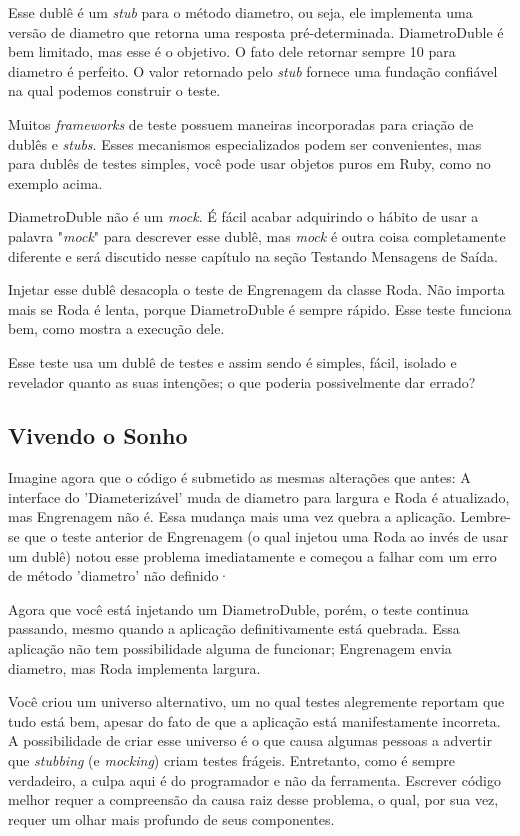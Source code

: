 Esse dublê é um \textit{stub} para o método diametro, ou seja, ele implementa
uma versão de diametro que retorna uma resposta pré-determinada. DiametroDuble
é bem limitado, mas esse é o objetivo. O fato dele retornar sempre 10 para
diametro é perfeito. O valor retornado pelo \textit{stub} fornece uma fundação
confiável na qual podemos construir o teste.

Muitos \textit{frameworks} de teste possuem maneiras incorporadas para criação
de dublês e \textit{stubs}. Esses mecanismos especializados podem ser
convenientes, mas para dublês de testes simples, você pode usar objetos puros
em Ruby, como no exemplo acima.

DiametroDuble não é um \textit{mock}. É fácil acabar adquirindo o hábito de usar
a palavra "\textit{mock}" para descrever esse dublê, mas \textit{mock} é outra
coisa completamente diferente e será discutido nesse capítulo na seção
Testando Mensagens de Saída.

Injetar esse dublê desacopla o teste de Engrenagem da classe Roda. Não importa
mais se Roda é lenta, porque DiametroDuble é sempre rápido. Esse teste
funciona bem, como mostra a execução dele.

Esse teste usa um dublê de testes e assim sendo é simples, fácil, isolado e
revelador quanto as suas intenções; o que poderia possivelmente dar errado?

\subsection{Vivendo o Sonho}

Imagine agora que o código é submetido as mesmas alterações que antes:
A interface do 'Diameterizável' muda de diametro para largura e Roda é
atualizado, mas Engrenagem não é. Essa mudança mais uma vez quebra a aplicação.
Lembre-se que o teste anterior de Engrenagem (o qual injetou uma Roda ao invés
de usar um dublê) notou esse problema imediatamente e começou a falhar com um
erro de método 'diametro' não definido·

Agora que você está injetando um DiametroDuble, porém, o teste continua
passando, mesmo quando a aplicação definitivamente está quebrada. Essa aplicação
não tem possibilidade alguma de funcionar; Engrenagem envia diametro, mas Roda
implementa largura.

Você criou um universo alternativo, um no qual testes alegremente reportam que
tudo está bem, apesar do fato de que a aplicação está manifestamente incorreta.
A possibilidade de criar esse universo é o que causa algumas pessoas a advertir
que \textit{stubbing} (e \textit{mocking}) criam testes frágeis. Entretanto,
como é sempre verdadeiro, a culpa aqui é do programador e não da ferramenta.
Escrever código melhor requer a compreensão da causa raiz desse problema, o
qual, por sua vez, requer um olhar mais profundo de seus componentes.

